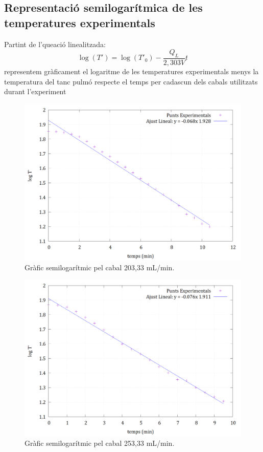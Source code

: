 \documentclass[10pt, twoside]{article}
\begin{document}
\subsection{Representació semilogarítmica de les temperatures experimentals}
Partint de l'queació linealitzada: 
\begin{equation}
    \log(T') = \log(T'_0) - \frac{Q_L}{2,303V} t
\end{equation}
representem gràficament el logaritme de les temperatures experimentals menys la temperatura del tanc pulmó respecte el temps per cadascun dels cabals utilitzats durant l'experiment

\begin{figure}[H]
    \centering
    \includegraphics[width=0.7\linewidth]{ajustsemilog203.png}
    \caption{Gràfic semilogarítmic pel cabal 203,33 mL/min.}
    \label{fig2}
\end{figure}

\begin{figure}[H]
    \centering
    \includegraphics[width=0.7\linewidth]{ajustsemilog253.png}
    \caption{Gràfic semilogarítmic pel cabal 253,33 mL/min.}
    \label{fig3}
\end{figure}
\end{document}
